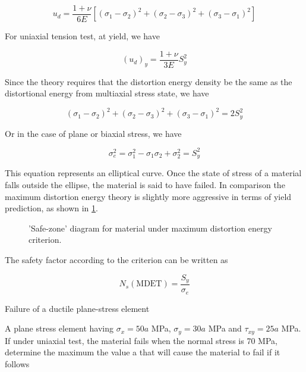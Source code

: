 \documentclass[a4paper,openany,nobib]{tufte-book}
\begin{document}
$$u_d = \frac{1 + \nu}{6E}\left[ (\sigma_1 - \sigma_2)^2 + (\sigma _2 - \sigma_3)^2 + (\sigma_3 - \sigma_1)^2 \right]$$

For uniaxial tension test, at yield, we have

$$(u_d)_y = \frac{1 + \nu}{3E}S_y^2$$

Since the theory requires that the distortion energy density be the same
as the distortional energy from multiaxial stress state, we have

$$(\sigma_1 - \sigma_2)^2 + (\sigma_2 - \sigma_3)^2 + (\sigma_3 - \sigma_1)^2 = 2S_y^2$$

Or in the case of plane or biaxial stress, we have

$$\sigma_e^2 = \sigma_1^2 - \sigma_1\sigma_2 + \sigma_2^2 = S_y^2$$

This equation represents an elliptical curve. Once the state of stress
of a material falls outside the ellipse, the material is said to have
failed. In comparison the maximum distortion energy theory is slightly
more aggressive in terms of yield prediction, as shown in
\ref{fig: MDET safe zone}.

\begin{figure}[h]
  \centering
  \caption{'Safe-zone' diagram for material under maximum distortion energy criterion.}
  \label{fig: MDET safe zone}
\end{figure}

The safety factor according to the criterion can be written as

$$N_s(\text{MDET}) = \frac{S_y}{\sigma_e}$$

Failure of a ductile plane-stress element

A plane stress element having \(\sigma_x = 50a\) MPa, \(\sigma_y = 30a\) MPa
and \(\tau_{xy} =  25a\) MPa. If under uniaxial test, the material fails
when the normal stress is 70 MPa, determine the maximum the value a that
will cause the material to fail if it follows
\end{document}
